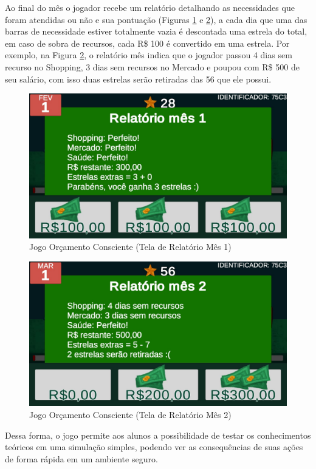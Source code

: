 Ao final do mês o jogador recebe um relatório detalhando as necessidades que foram atendidas ou não e sua pontuação (Figuras \ref{fig: figura05-relatorio-01} e \ref{fig: figura06-relatorio-02}), a cada dia que uma das barras de necessidade estiver totalmente vazia é descontada uma estrela do total, em caso de sobra de recursos, cada R{\$} 100 é convertido em uma estrela. Por exemplo, na Figura \ref{fig: figura06-relatorio-02}, o relatório mês indica que o jogador passou 4 dias sem recurso no Shopping, 3 dias sem recursos no Mercado e poupou com R{\$} 500 de seu salário, com isso duas estrelas serão retiradas das 56 que ele possui.

\graphicspath{{figuras/}}
\begin{figure}[!ht]
\centering
\begin{minipage}{1\linewidth}
\center
\caption{Jogo Orçamento Consciente (Tela de Relatório Mês 1)} \label{fig: figura05-relatorio-01}
\includegraphics[width=0.4\linewidth]{05-figura_relatorio-mes-1}
\end{minipage}
\end{figure}

\graphicspath{{figuras/}}
\begin{figure}[!ht]
\centering
\begin{minipage}{1\linewidth}
\center
\caption{Jogo Orçamento Consciente (Tela de Relatório Mês 2)} \label{fig: figura06-relatorio-02}
\includegraphics[width=0.4\linewidth]{06-figura_tela-relatorio-mes-2}
\end{minipage}
\end{figure}

Dessa forma, o jogo permite aos alunos a possibilidade de testar os conhecimentos teóricos em uma simulação simples, podendo ver as consequências de suas ações de forma rápida em um ambiente seguro.

